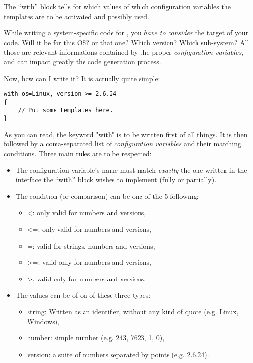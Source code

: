 \documentclass[american]{rtxreport}
\begin{document}
The ``with'' block tells for which values of which configuration variables the
templates are to be activated and possibly used.  

While writing a system-specific code for \rtx, you \emph{have to consider}
the target of your code. Will it be for this OS? or that one? Which version?
Which sub-system? All those are relevant informations contained by the proper
\emph{configuration variables}, and can impact greatly the code generation
process.

Now, how can I write it? It is actually quite simple:
\begin{lstlisting}
with os=Linux, version >= 2.6.24
{
    // Put some templates here.
}
\end{lstlisting}

As you can read, the keyword "with" is to be written first of all things. It is
then followed by a coma-separated list of \emph{configuration variables} and
their matching conditions. Three main rules are to be respected:
\begin{itemize}
    \item The configuration variable's name must match \emph{exactly} the one
          written in the interface the ``with'' block wishes to implement
          (fully or partially).
    \item The condition (or comparison) can be one of the 5 following: 
        \begin{itemize}
            \item <: only valid for numbers and versions,
            \item <=: only valid for numbers and versions,
            \item =: valid for strings, numbers and versions,
            \item >=: valid only for numbers and versions,
            \item >: valid only for numbers and versions.
        \end{itemize}
    \item The values can be of on of these three types:
        \begin{itemize}
            \item string: Written as an identifier, without any kind of quote
                           (e.g. Linux, Windows),
            \item number: simple number (e.g. 243, 7623, 1, 0),
            \item version: a suite of numbers separated by points (e.g. 2.6.24).
        \end{itemize}
\end{itemize}
\end{document}
